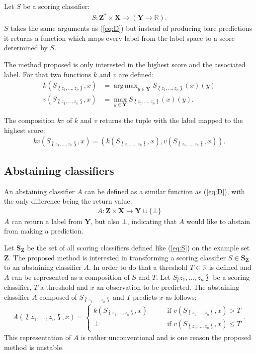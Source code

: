 \documentclass[twoside,11pt]{article}
\DeclareMathOperator*{\argmax}{arg\,max}
\def\ds{\Lbag z_1,\dots,z_n \Rbag}
\def\Z{\textbf{Z}}
\def\S{\textbf{S}_{\Z}}
\begin{document}
Let $S$ be a scoring classifier:
\begin{align}
  \label{eq:S}
  S: \textbf{Z}^* \times \textbf{X} \rightarrow
     (\textbf{Y} \rightarrow \mathbb{R}).
\end{align}
$S$ takes the same arguments as (\ref{eq:D}) but instead
of producing bare predictions it returns a function which
maps every label from the label space to a score
determined by $S$.

The method proposed is only interested in the highest
score and the associated label. For that two functions
$k$ and $v$ are defined:
\begin{align*}
  k(S_{\ds}, x) &= \argmax_{y \in \textbf{Y}}
    S_{\ds}(x)(y) \\
  v(S_{\ds}, x) &= \max_{y \in \textbf{Y}}
    S_{\ds}(x)(y).
\end{align*}

The composition $kv$ of $k$ and $v$ returns the tuple with
the label mapped to the highest score:
\begin{align}
  \label{eq:kv}
  kv(S_{\ds}, x) = (k(S_{\ds}, x), v(S_{\ds}, x)).
\end{align}

\subsection{Abstaining classifiers}

An abstaining classifier $A$ can be defined as a similar
function as (\ref{eq:D}), with the only difference being
the return value:
\begin{align*}
  A: \textbf{Z} \times \textbf{X} \rightarrow
      \textbf{Y} \cup \{\bot\}
\end{align*}
$A$ can return a label from $\textbf{Y}$, but also $\bot$,
indicating that $A$ would like to abstain from making a
prediction.

Let $\S$ be the set of all scoring classifiers defined like
(\ref{eq:S}) on the example set $\Z$.
The proposed method is interested in transforming a
scoring classifier $S \in \S$ to an abstaining classifier
$A$.
In order to do that a threshold $T \in \mathbb{R}$ is
defined and $A$ can be represented as a composition of $S$
and $T$.
Let $S_\ds$ be a scoring classifier, $T$ a threshold and
$x$ an observation to be predicted.
The abstaining classifier $A$ composed of $S_{\ds}$ and $T$
predicts $x$ as follows:
\begin{align}
  \label{eq:A}
  A(\ds, x) =
    \begin{cases}
      k(S_{\ds}, x) &\qquad \text{if } v(S_{\ds}, x) > T \\
      \bot &\qquad \text{if } v(S_{\ds}, x) \leq T
    \end{cases}.
\end{align}
This representation of $A$ is rather unconventional and
is one reason the proposed method is unstable.
\end{document}
